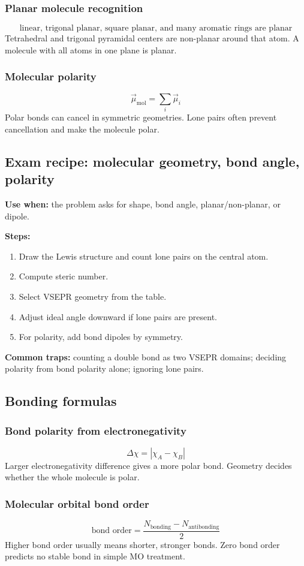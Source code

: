 \subsubsection{Planar molecule recognition}
\[
\text{linear, trigonal planar, square planar, and many aromatic rings are planar}
\]
Tetrahedral and trigonal pyramidal centers are non-planar around that atom. A molecule with all atoms in one plane is planar.

\subsubsection{Molecular polarity}
\[
\vec{\mu}_{\mathrm{mol}}=\sum_i\vec{\mu}_i
\]
Polar bonds can cancel in symmetric geometries. Lone pairs often prevent cancellation and make the molecule polar.

\subsection{Exam recipe: molecular geometry, bond angle, polarity}
\textbf{Use when:} the problem asks for shape, bond angle, planar/non-planar, or dipole.

\textbf{Steps:}
\begin{enumerate}
    \item Draw the Lewis structure and count lone pairs on the central atom.
    \item Compute steric number.
    \item Select VSEPR geometry from the table.
    \item Adjust ideal angle downward if lone pairs are present.
    \item For polarity, add bond dipoles by symmetry.
\end{enumerate}

\textbf{Common traps:} counting a double bond as two VSEPR domains; deciding polarity from bond polarity alone; ignoring lone pairs.

\subsection{Bonding formulas}

\subsubsection{Bond polarity from electronegativity}
\[
\Delta\chi=|\chi_A-\chi_B|
\]
Larger electronegativity difference gives a more polar bond. Geometry decides whether the whole molecule is polar.

\subsubsection{Molecular orbital bond order}
\[
\text{bond order}=\frac{N_{\mathrm{bonding}}-N_{\mathrm{antibonding}}}{2}
\]
Higher bond order usually means shorter, stronger bonds. Zero bond order predicts no stable bond in simple MO treatment.
